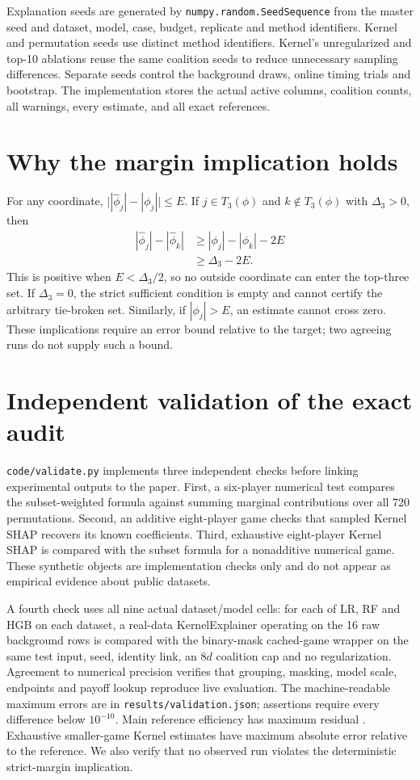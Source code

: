 Explanation seeds are generated by \texttt{numpy.random.SeedSequence} from the master seed and dataset, model, case, budget, replicate and method identifiers. Kernel and permutation seeds use distinct method identifiers. Kernel's unregularized and top-10 ablations reuse the same coalition seeds to reduce unnecessary sampling differences. Separate seeds control the background draws, online timing trials and bootstrap. The implementation stores the actual active columns, coalition counts, all warnings, every estimate, and all exact references.

\section{Why the margin implication holds}
\label{app:proof}
For any coordinate, $\big||\widehat\phi_j|-|\phi_j|\big|\leq E$. If $j\in T_3(\phi)$ and $k\notin T_3(\phi)$ with $\Delta_3>0$, then
\begin{align*}
 |\widehat\phi_j|-|\widehat\phi_k|
 &\geq |\phi_j|-|\phi_k|-2E\\
 &\geq \Delta_3-2E.
\end{align*}
This is positive when $E<\Delta_3/2$, so no outside coordinate can enter the top-three set. If $\Delta_3=0$, the strict sufficient condition is empty and cannot certify the arbitrary tie-broken set. Similarly, if $|\phi_j|>E$, an estimate cannot cross zero. These implications require an error bound relative to the target; two agreeing runs do not supply such a bound.

\section{Independent validation of the exact audit}
\label{app:validation}
\texttt{code/validate.py} implements three independent checks before linking experimental outputs to the paper. First, a six-player numerical test compares the subset-weighted formula against summing marginal contributions over all 720 permutations. Second, an additive eight-player game checks that sampled Kernel SHAP recovers its known coefficients. Third, exhaustive eight-player Kernel SHAP is compared with the subset formula for a nonadditive numerical game. These synthetic objects are implementation checks only and do not appear as empirical evidence about public datasets.

A fourth check uses all nine actual dataset/model cells: for each of LR, RF and HGB on each dataset, a real-data KernelExplainer operating on the 16 raw background rows is compared with the binary-mask cached-game wrapper on the same test input, seed, identity link, an $8d$ coalition cap and no regularization. Agreement to numerical precision verifies that grouping, masking, model scale, endpoints and payoff lookup reproduce live evaluation. The machine-readable maximum errors are in \texttt{results/validation.json}; assertions require every difference below $10^{-10}$. Main reference efficiency has maximum residual \ReferenceEfficiency{}. Exhaustive smaller-game Kernel estimates have maximum absolute error \ExhaustiveError{} relative to the reference. We also verify that no observed run violates the deterministic strict-margin implication.

